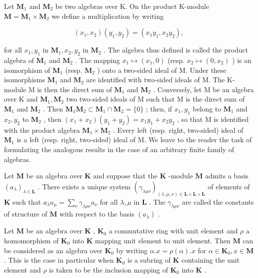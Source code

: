 Let \(\mathbf{M}_1\) and \(\mathbf{M}_2\) be two algebras over K. On the product K-module \(\mathbf{M} = \mathbf{M}_1 \times \mathbf{M}_2\) we define a multiplication by writing

\[
(x _ {1}, x _ {2}) (y _ {1}, y _ {2}) = (x _ {1} y _ {1}, x _ {2} y _ {2}),
\]

for all \(x_1, y_1\) in \(\mathbf{M}_1, x_2, y_2\) in \(\mathbf{M}_2\) . The algebra thus defined is called the product algebra of \(\mathbf{M}_1\) and \(\mathbf{M}_2\) . The mapping \(x_1 \mapsto (x_1, 0)\) (resp. \(x_2 \mapsto (0, x_2)\) ) is an isomorphism of \(\mathbf{M}_1\) (resp. \(\mathbf{M}_2\) ) onto a two-sided ideal of M. Under these isomorphisms \(\mathbf{M}_1\) and \(\mathbf{M}_2\) are identified with two-sided ideals of M. The K-module M is then the direct sum of \(\mathbf{M}_1\) and \(\mathbf{M}_2\) . Conversely, let M be an algebra over K and \(\mathbf{M}_1, \mathbf{M}_2\) two two-sided ideals of M such that M is the direct sum of \(\mathbf{M}_1\) and \(\mathbf{M}_2\) . Then \(\mathbf{M}_1\mathbf{M}_2 \subset \mathbf{M}_1 \cap \mathbf{M}_2 = \{0\}\) ; then, if \(x_1, y_1\) belong to \(\mathbf{M}_1\) and \(x_2, y_2\) to \(\mathbf{M}_2\) , then \((x_1 + x_2)(y_1 + y_2) = x_1y_1 + x_2y_2\) , so that M is identified with the product algebra \(\mathbf{M}_1 \times \mathbf{M}_2\) . Every left (resp. right, two-sided) ideal of \(\mathbf{M}_1\) is a left (resp. right, two-sided) ideal of M. We leave to the reader the task of formulating the analogous results in the case of an arbitrary finite family of algebras.

Let \(\mathbf{M}\) be an algebra over \(\mathbf{K}\) and suppose that the \(\mathbf{K}\) -module \(\mathbf{M}\) admits a basis \((a_{\lambda})_{\lambda \in \mathbf{L}}\) . There exists a unique system \((\gamma_{\lambda \mu \nu})_{(\lambda, \mu, \nu) \in \mathbf{L} \times \mathbf{L} \times \mathbf{L}}\) of elements of \(\mathbf{K}\) such that \(a_{\lambda}a_{\mu} = \sum_{\nu} \gamma_{\lambda \mu \nu}a_{\nu}\) for all \(\lambda, \mu\) in \(\mathbf{L}\) . The \(\gamma_{\lambda \mu \nu}\) are called the constants of structure of \(\mathbf{M}\) with respect to the basis \((a_{\lambda})\) .

Let \(\mathbf{M}\) be an algebra over \(\mathbf{K}\) , \(\mathbf{K}_0\) a commutative ring with unit element and \(\rho\) a homomorphism of \(\mathbf{K}_0\) into \(\mathbf{K}\) mapping unit element to unit element. Then \(\mathbf{M}\) can be considered as an algebra over \(\mathbf{K}_0\) by writing \(\alpha.x = \rho(\alpha).x\) for \(\alpha \in \mathbf{K}_0, x \in \mathbf{M}\) . This is the case in particular when \(\mathbf{K}_0\) is a subring of \(\mathbf{K}\) containing the unit element and \(\rho\) is taken to be the inclusion mapping of \(\mathbf{K}_0\) into \(\mathbf{K}\) .

